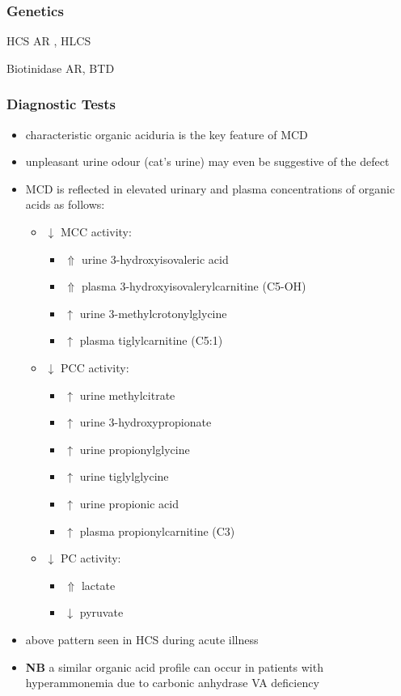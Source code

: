 \documentclass{scrartcl}
\begin{document}
\subsubsection{Genetics}
\label{sec:org8b6f815}
\begin{description}
\item{HCS} AR , HLCS
\item{Biotinidase} AR, BTD
\end{description}

\subsubsection{Diagnostic Tests}
\label{sec:org70b27c6}
\begin{itemize}
\item characteristic organic aciduria is the key feature of MCD
\item unpleasant urine odour (cat’s urine) may even be suggestive of the
defect
\item MCD is reflected in elevated urinary and plasma concentrations of
organic acids as follows:
\begin{itemize}
\item \(\downarrow\) MCC activity:
\begin{itemize}
\item \(\Uparrow\) urine 3-hydroxyisovaleric acid
\item \(\Uparrow\) plasma 3-hydroxyisovalerylcarnitine (C5-OH)
\item \(\uparrow\) urine 3-methylcrotonylglycine
\item \(\uparrow\) plasma tiglylcarnitine (C5:1)
\end{itemize}
\item \(\downarrow\) PCC activity:
\begin{itemize}
\item \(\uparrow\) urine methylcitrate
\item \(\uparrow\) urine 3-hydroxypropionate
\item \(\uparrow\) urine propionylglycine
\item \(\uparrow\) urine tiglylglycine
\item \(\uparrow\) urine propionic acid
\item \(\uparrow\) plasma propionylcarnitine (C3)
\end{itemize}
\item \(\downarrow\) PC activity:
\begin{itemize}
\item \(\Uparrow\) lactate
\item \(\downarrow\) pyruvate
\end{itemize}
\end{itemize}
\item above pattern seen in HCS during acute illness
\item \textbf{NB} a similar organic acid profile can occur in patients with
hyperammonemia due to carbonic anhydrase VA deficiency
\end{itemize}
\end{document}
